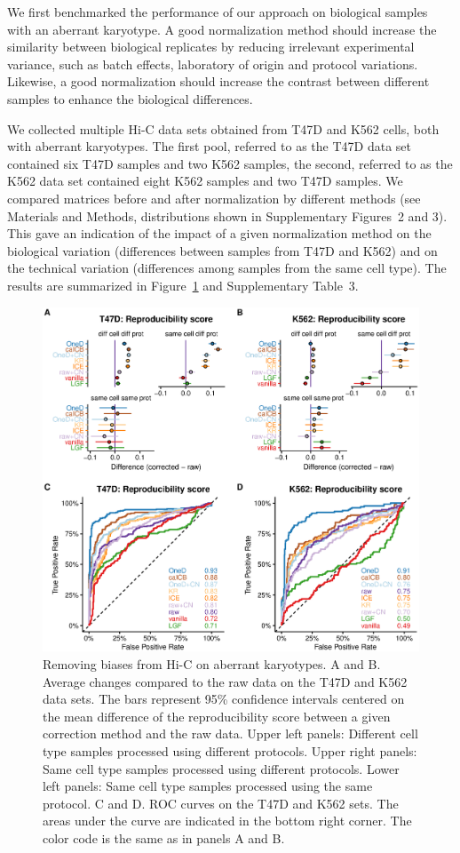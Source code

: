 \documentclass[a4,center,fleqn]{NAR}
\begin{document}
We first benchmarked the performance of our approach on biological
samples with an aberrant karyotype. A good normalization method should
increase the similarity between biological replicates by reducing
irrelevant experimental variance, such as batch effects, laboratory of
origin and protocol variations. Likewise, a good normalization should
increase the contrast between different samples to enhance the
biological differences.

We collected multiple Hi-C data sets obtained from T47D and K562 cells,
both with aberrant karyotypes. The first pool, referred to as the T47D data
set contained six T47D samples and two K562 samples, the second, referred
to as the K562 data set contained eight K562 samples and two T47D samples.
We compared matrices before and after normalization by different methods
(see Materials and Methods, distributions shown in Supplementary Figures~2
and 3). This gave an indication of the impact of a given normalization
method on the biological variation (differences between samples from T47D
and K562) and on the technical variation (differences among samples from
the same cell type). The results are summarized in
Figure~\ref{fig:aberrant} and Supplementary Table~3.

\begin{figure}
\centerline{\includegraphics[width=.49\textwidth]
  {nar_figures/figure_2.eps}}
\caption{Removing biases from Hi-C on aberrant karyotypes. A and B.
Average changes compared to the raw data on the T47D and K562 data sets.
The bars represent 95\% confidence intervals centered on the mean
difference of the reproducibility score between a given correction method
and the raw data. Upper left panels: Different cell type samples
processed using different protocols. Upper right panels: Same cell
type samples processed using different protocols. Lower left panels:
Same cell type samples processed using the same protocol. C and D. ROC
curves on the T47D and K562 sets. The areas under the curve are
indicated in the bottom right corner. The color code is the same as in
panels A and B.}
\label{fig:aberrant}
\end{figure}
\end{document}
